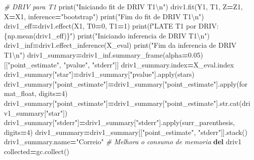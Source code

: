 \documentclass[
]{article}
\newenvironment{Shaded}{\begin{snugshade}}{\end{snugshade}}
\newcommand{\BuiltInTok}[1]{#1}
\newcommand{\CharTok}[1]{\textcolor[rgb]{0.31,0.60,0.02}{#1}}
\newcommand{\CommentTok}[1]{\textcolor[rgb]{0.56,0.35,0.01}{\textit{#1}}}
\newcommand{\DecValTok}[1]{\textcolor[rgb]{0.00,0.00,0.81}{#1}}
\newcommand{\FloatTok}[1]{\textcolor[rgb]{0.00,0.00,0.81}{#1}}
\newcommand{\KeywordTok}[1]{\textcolor[rgb]{0.13,0.29,0.53}{\textbf{#1}}}
\newcommand{\NormalTok}[1]{#1}
\newcommand{\OperatorTok}[1]{\textcolor[rgb]{0.81,0.36,0.00}{\textbf{#1}}}
\newcommand{\SpecialCharTok}[1]{\textcolor[rgb]{0.00,0.00,0.00}{#1}}
\newcommand{\SpecialStringTok}[1]{\textcolor[rgb]{0.31,0.60,0.02}{#1}}
\newcommand{\StringTok}[1]{\textcolor[rgb]{0.31,0.60,0.02}{#1}}
\begin{document}
\begin{Shaded}
\begin{Highlighting}[]
{{\CommentTok{# DRIV para T1}
\BuiltInTok{print}\NormalTok{(}\StringTok{"Iniciando fit de DRIV T1}\CharTok{\textbackslash{}n}\StringTok{"}\NormalTok{)}
\NormalTok{driv1.fit(Y1, T1, Z}\OperatorTok{=}\NormalTok{Z1, X}\OperatorTok{=}\NormalTok{X1, inference}\OperatorTok{=}\StringTok{"bootstrap"}\NormalTok{)}
\BuiltInTok{print}\NormalTok{(}\StringTok{"Fim do fit de DRIV T1}\CharTok{\textbackslash{}n}\StringTok{"}\NormalTok{)}
\NormalTok{driv1_eff}\OperatorTok{=}\NormalTok{driv1.effect(X1, T0}\OperatorTok{=}\DecValTok{0}\NormalTok{, T1}\OperatorTok{=}\DecValTok{1}\NormalTok{)}
\BuiltInTok{print}\NormalTok{(}\SpecialStringTok{f"LATE T1 por DRIV: }\SpecialCharTok{\{np.}\NormalTok{mean(driv1_eff)}\SpecialCharTok{\}}\SpecialStringTok{"}\NormalTok{)}
\BuiltInTok{print}\NormalTok{(}\StringTok{"Iniciando inferencia de DRIV T1}\CharTok{\textbackslash{}n}\StringTok{"}\NormalTok{)}
\NormalTok{driv1_inf}\OperatorTok{=}\NormalTok{driv1.effect_inference(X_eval)}
\BuiltInTok{print}\NormalTok{(}\StringTok{"Fim da inferencia de DRIV T1}\CharTok{\textbackslash{}n}\StringTok{"}\NormalTok{)}
\NormalTok{driv1_summary}\OperatorTok{=}\NormalTok{driv1_inf.summary_frame(alpha}\OperatorTok{=}\FloatTok{0.05}\NormalTok{)[[}\StringTok{"point_estimate"}\NormalTok{, }\StringTok{"pvalue"}\NormalTok{, }\StringTok{"stderr"}\NormalTok{]]}
\NormalTok{driv1_summary.index}\OperatorTok{=}\NormalTok{X_eval.index}
\NormalTok{driv1_summary[}\StringTok{"star"}\NormalTok{]}\OperatorTok{=}\NormalTok{driv1_summary[}\StringTok{"pvalue"}\NormalTok{].}\BuiltInTok{apply}\NormalTok{(stars)}
\NormalTok{driv1_summary[}\StringTok{"point_estimate"}\NormalTok{]}\OperatorTok{=}\NormalTok{driv1_summary[}\StringTok{"point_estimate"}\NormalTok{].}\BuiltInTok{apply}\NormalTok{(format_float, digits}\OperatorTok{=}\DecValTok{4}\NormalTok{)}
\NormalTok{driv1_summary[}\StringTok{"point_estimate"}\NormalTok{]}\OperatorTok{=}\NormalTok{driv1_summary[}\StringTok{"point_estimate"}\NormalTok{].}\BuiltInTok{str}\NormalTok{.cat(driv1_summary[}\StringTok{"star"}\NormalTok{])}
\NormalTok{driv1_summary[}\StringTok{"stderr"}\NormalTok{]}\OperatorTok{=}\NormalTok{driv1_summary[}\StringTok{"stderr"}\NormalTok{].}\BuiltInTok{apply}\NormalTok{(surr_parenthesis, digits}\OperatorTok{=}\DecValTok{4}\NormalTok{)}
\NormalTok{driv1_summary}\OperatorTok{=}\NormalTok{driv1_summary[[}\StringTok{"point_estimate"}\NormalTok{, }\StringTok{"stderr"}\NormalTok{]].stack()}
\NormalTok{driv1_summary.name}\OperatorTok{=}\StringTok{"Correio"}
\CommentTok{# Melhora o consumo de memoria}
\KeywordTok{del}\NormalTok{ driv1}
\NormalTok{collected}\OperatorTok{=}\NormalTok{gc.collect()}

}}
\end{Highlighting}
\end{Shaded}
\end{document}
